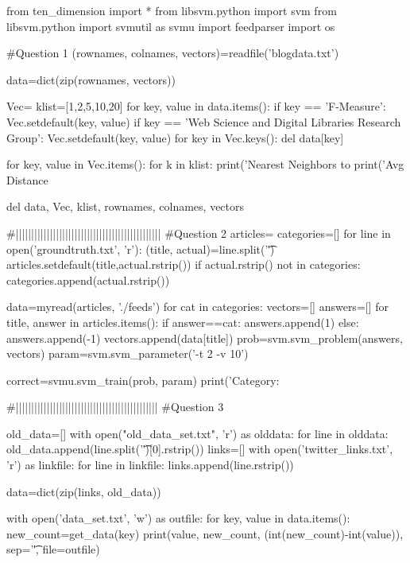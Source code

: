 \documentclass[12pt, letterpaper]{article}
\begin{document}
\FloatBarrier
\begin{MyPython}[caption=tenMain.py, label=lst:tenmain]
from ten_dimension import *
from libsvm.python import svm
from libsvm.python import svmutil as svmu
import feedparser
import os



#Question 1
(rownames, colnames, vectors)=readfile('blogdata.txt')

data=dict(zip(rownames, vectors))

Vec={}
klist=[1,2,5,10,20]
for key, value in data.items():
    if key == 'F-Measure':
        Vec.setdefault(key, value)
    if key == 'Web Science and Digital Libraries Research Group':
        Vec.setdefault(key, value)
for key in Vec.keys():
    del data[key]


for key, value in Vec.items():
    for k in klist:
        print('Nearest Neighbors to %
        print('Avg Distance %
        
del data, Vec, klist, rownames, colnames, vectors

#|||||||||||||||||||||||||||||||||||||||||||||||
#Question 2
articles={}
categories=[]
for line in open('groundtruth.txt', 'r'):
    (title, actual)=line.split('\t')
    articles.setdefault(title,actual.rstrip())
    if actual.rstrip() not in categories:
        categories.append(actual.rstrip())

data=myread(articles, './feeds')
for cat in categories:
    vectors=[]
    answers=[]
    for title, answer in articles.items():
        if answer==cat:
            answers.append(1)
        else:
            answers.append(-1)
        vectors.append(data[title])
    prob=svm.svm_problem(answers, vectors)
    param=svm.svm_parameter('-t 2 -v 10')
    
    correct=svmu.svm_train(prob, param)
    print('Category: %
    
#||||||||||||||||||||||||||||||||||||||||||||||
#Question 3

old_data=[]
with open("old_data_set.txt", 'r') as olddata:
    for line in olddata:
        old_data.append(line.split('\t')[0].rstrip())
links=[]
with open('twitter_links.txt', 'r') as linkfile:
    for line in linkfile:
        links.append(line.rstrip())

data=dict(zip(links, old_data))

with open('data_set.txt', 'w') as outfile:
    for key, value in data.items():
        new_count=get_data(key)
        print(value, new_count, (int(new_count)-int(value)), sep='\t', file=outfile)

\end{MyPython}
\end{document}
